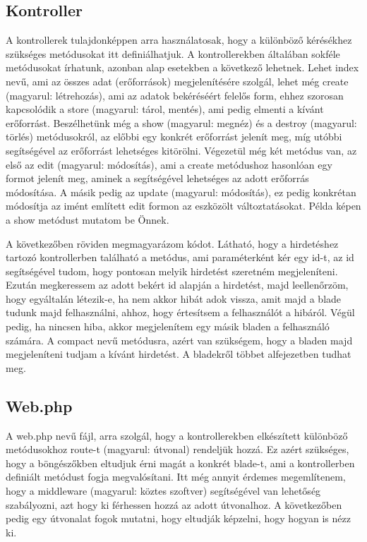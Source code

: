 \documentclass[]{thesis-ekf}
\theoremstyle{definition}
\theoremstyle{remark}
\begin{document}
	\subsection{Kontroller}\label{sc-kontroller}
	A kontrollerek tulajdonképpen arra használatosak, hogy a különböző kérésékhez szükséges metódusokat itt definiálhatjuk. A kontrollerekben általában sokféle metódusokat írhatunk, azonban alap esetekben a következő lehetnek. Lehet index nevű, ami az összes adat (erőforrások) megjelenítésére szolgál, lehet még create (magyarul: létrehozás), ami az adatok bekéréséért felelős form, ehhez szorosan kapcsolódik a store (magyarul: tárol, mentés), ami pedig elmenti a kívánt erőforrást. Beszélhetünk még a show (magyarul: megnéz) és a destroy (magyarul: törlés) metódusokról, az előbbi egy konkrét erőforrást jelenít meg, míg utóbbi segítségével az erőforrást lehetséges kitörölni. Végezetül még két metódus van, az első az edit (magyarul: módosítás), ami a create metódushoz hasonlóan egy formot jelenít meg, aminek a segítségével lehetséges az adott erőforrás módosítása. A másik pedig az update (magyarul: módosítás), ez pedig konkrétan módosítja az imént említett edit formon az eszközölt változtatásokat. Példa képen a show metódust mutatom be Önnek. \cite{Laravel}
	
	
	
	A következőben röviden megmagyarázom  kódot. Látható, hogy a hirdetéshez tartozó kontrollerben található a metódus, ami paraméterként kér egy id-t, az id segítségével tudom, hogy pontosan melyik hirdetést szeretném megjeleníteni. Ezután megkeressem az adott bekért id alapján a hirdetést, majd leellenőrzöm, hogy egyáltalán létezik-e, ha nem akkor hibát adok vissza, amit majd a blade tudunk majd felhasználni, ahhoz, hogy értesítsem a felhasználót a hibáról. Végül pedig, ha nincsen hiba, akkor megjelenítem egy másik bladen a felhasználó számára. A compact nevű metódusra, azért van szükségem, hogy a bladen majd megjeleníteni tudjam a kívánt hirdetést. A bladekről többet  alfejezetben tudhat meg.
	  
	\subsection{Web.php}
	A web.php nevű fájl, arra szolgál, hogy a kontrollerekben elkészített különböző metódusokhoz route-t (magyarul: útvonal) rendeljük hozzá. Ez azért szükséges, hogy a böngészőkben eltudjuk érni magát a konkrét blade-t, ami a kontrollerben definiált metódust fogja megvalósítani. Itt még annyit érdemes megemlítenem, hogy a middleware (magyarul: köztes szoftver) segítségével van lehetőség szabályozni, azt hogy ki férhessen hozzá az adott útvonalhoz. A következőben pedig egy útvonalat fogok mutatni, hogy eltudják képzelni, hogy hogyan is nézz ki.
	
\end{document}
